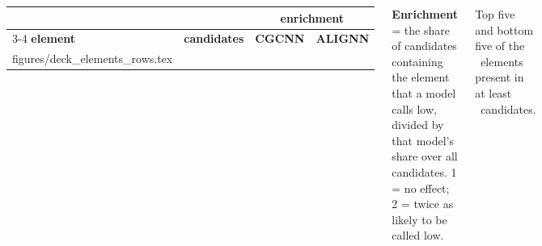 \documentclass[aspectratio=169]{beamer}
\makeatletter
\newcommand{\TableRows}[1]{\@@input #1 }
\makeatother
\begin{document}
\begin{frame}

\begin{columns}[T]
\begin{center}
{\sffamily\scriptsize
\begin{tabular}{@{}lrrr@{}}
\toprule
& & \multicolumn{2}{c}{\textbf{enrichment}} \\
\cmidrule(l){3-4}
\textbf{element} & \textbf{candidates} & \textcolor{SlideBlue}{\textbf{CGCNN}} & \textcolor{SlideGreen}{\textbf{ALIGNN}} \\
\midrule
\TableRows{figures/deck_elements_rows.tex}
\bottomrule
\end{tabular}}
\end{center}
{\sffamily\footnotesize
\textbf{Enrichment} = the share of candidates containing the element that a
model calls low, divided by that model's share over all candidates. 1 = no
effect; 2 = twice as likely to be called low.

\vspace{5pt}
Top five and bottom five of the \DElemCount\ elements present in at least
\DElemMinN\ candidates.}

\vspace{5pt}
\end{columns}

\end{frame}
\end{document}
